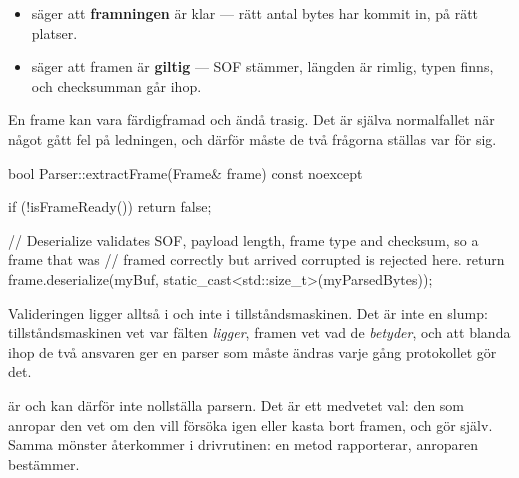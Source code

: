 \begin{itemize}
  \item {} säger att \textbf{framningen} är klar --- rätt antal bytes har
    kommit in, på rätt platser.
  \item {} säger att framen är \textbf{giltig} --- SOF stämmer, längden är
    rimlig, typen finns, och checksumman går ihop.
\end{itemize}

En frame kan vara färdigframad och ändå trasig. Det är själva normalfallet när något gått fel på
ledningen, och därför måste de två frågorna ställas var för sig.

\begin{cppcode}
bool Parser::extractFrame(Frame& frame) const noexcept
{
    if (!isFrameReady()) { return false; }

    // Deserialize validates SOF, payload length, frame type and checksum, so a frame that was
    // framed correctly but arrived corrupted is rejected here.
    return frame.deserialize(myBuf, static_cast<std::size_t>(myParsedBytes));
}
\end{cppcode}

Valideringen ligger alltså i  och inte i tillståndsmaskinen. Det är
inte en slump: tillståndsmaskinen vet var fälten \emph{ligger}, framen vet vad de \emph{betyder},
och att blanda ihop de två ansvaren ger en parser som måste ändras varje gång protokollet gör det.

\begin{aside}
\note {} är  och kan därför inte nollställa parsern. Det är ett
medvetet val: den som anropar den vet om den vill försöka igen eller kasta bort framen, och gör
 själv. Samma mönster återkommer i drivrutinen: en metod rapporterar, anroparen
bestämmer.
\end{aside}
